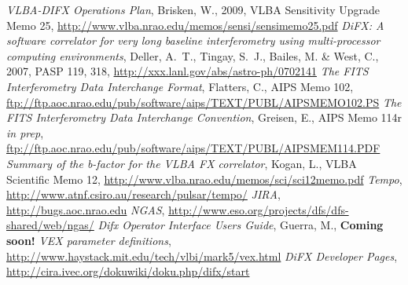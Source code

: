 \begin{thebibliography}{}
	{\it VLBA-DIFX Operations Plan}, Brisken, W., 2009, VLBA Sensitivity Upgrade Memo 25, \url{http://www.vlba.nrao.edu/memos/sensi/sensimemo25.pdf}
	{\it DiFX: A software correlator for very long baseline interferometry using multi-processor computing environments}, Deller, A.~T., Tingay, S.~J., Bailes, M. \& West, C., 2007, PASP 119, 318, \url{http://xxx.lanl.gov/abs/astro-ph/0702141}
	{\it The FITS Interferometry Data Interchange Format}, Flatters, C., AIPS Memo 102, \url{ftp://ftp.aoc.nrao.edu/pub/software/aips/TEXT/PUBL/AIPSMEMO102.PS}
	{\it The FITS Interferometry Data Interchange Convention}, Greisen, E., AIPS Memo 114r {\it in prep}, \url{ftp://ftp.aoc.nrao.edu/pub/software/aips/TEXT/PUBL/AIPSMEM114.PDF}
	{\it Summary of the b-factor for the VLBA FX correlator}, Kogan, L., VLBA Scientific Memo 12, \url{http://www.vlba.nrao.edu/memos/sci/sci12memo.pdf}
	{\it Tempo}, \url{http://www.atnf.csiro.au/research/pulsar/tempo/}
	{\it JIRA}, \url{http://bugs.aoc.nrao.edu}
	{\it NGAS}, \url{http://www.eso.org/projects/dfs/dfs-shared/web/ngas/}
	{\it Difx Operator Interface Users Guide}, Guerra, M., {\bf Coming soon!}
	{\it VEX parameter definitions}, \url{http://www.haystack.mit.edu/tech/vlbi/mark5/vex.html}
	{\it DiFX Developer Pages}, \url{http://cira.ivec.org/dokuwiki/doku.php/difx/start}
\end{thebibliography}
